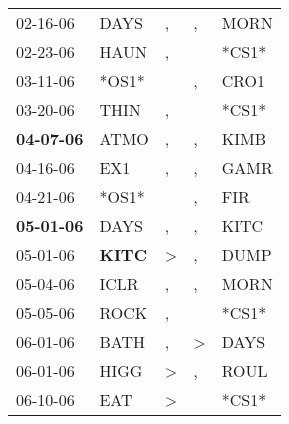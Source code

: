 \begin{supertabular}{p{0.07\textwidth}p{0.06\textwidth}p{0.02\textwidth}p{0.02\textwidth}p{0.06\textwidth}}
          02-16-06\textsuperscript{} &           DAYS\textsuperscript{} &                , &                , &           MORN\textsuperscript{} \\
          02-23-06\textsuperscript{} &           HAUN\textsuperscript{} &                , &                  &                            *CS1* \\
          03-11-06\textsuperscript{} &                            *OS1* &                  &                , &           CRO1\textsuperscript{} \\
          03-20-06\textsuperscript{} &           THIN\textsuperscript{} &                , &                  &                            *CS1* \\
 \textbf{04-07-06\textsuperscript{}} &           ATMO\textsuperscript{} &                , &                , &           KIMB\textsuperscript{} \\
          04-16-06\textsuperscript{} &            EX1\textsuperscript{} &                , &                , &           GAMR\textsuperscript{} \\
          04-21-06\textsuperscript{} &                            *OS1* &                  &                , &            FIR\textsuperscript{} \\
 \textbf{05-01-06\textsuperscript{}} &           DAYS\textsuperscript{} &                , &                , &           KITC\textsuperscript{} \\
          05-01-06\textsuperscript{} &  \textbf{KITC\textsuperscript{}} &     \textgreater &                , &           DUMP\textsuperscript{} \\
          05-04-06\textsuperscript{} &           ICLR\textsuperscript{} &                , &                , &           MORN\textsuperscript{} \\
          05-05-06\textsuperscript{} &           ROCK\textsuperscript{} &                , &                  &                            *CS1* \\
          06-01-06\textsuperscript{} &           BATH\textsuperscript{} &                , &     \textgreater &           DAYS\textsuperscript{} \\
          06-01-06\textsuperscript{} &           HIGG\textsuperscript{} &     \textgreater &                , &           ROUL\textsuperscript{} \\
          06-10-06\textsuperscript{} &            EAT\textsuperscript{} &     \textgreater &                  &                            *CS1* \\

\end{supertabular}
